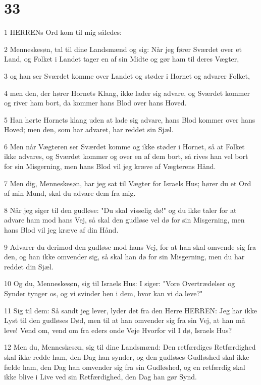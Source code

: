 \chapter{33}

\par 1 HERRENs Ord kom til mig således:
\par 2 Menneskesøn, tal til dine Landsmænd og sig: Når jeg fører Sværdet over et Land, og Folket i Landet tager en af sin Midte og gør ham til deres Vægter,
\par 3 og han ser Sværdet komme over Landet og støder i Hornet og advarer Folket,
\par 4 men den, der hører Hornets Klang, ikke lader sig advare, og Sværdet kommer og river ham bort, da kommer hans Blod over hans Hoved.
\par 5 Han hørte Hornets klang uden at lade sig advare, hans Blod kommer over hans Hoved; men den, som har advaret, har reddet sin Sjæl.
\par 6 Men når Vægteren ser Sværdet komme og ikke støder i Hornet, så at Folket ikke advares, og Sværdet kommer og over en af dem bort, så rives han vel bort for sin Misgerning, men hans Blod vil jeg kræve af Vægterens Hånd.
\par 7 Men dig, Menneskesøn, har jeg sat til Vægter for Israels Hus; hører du et Ord af min Mund, skal du advare dem fra mig.
\par 8 Når jeg siger til den gudløse: "Du skal visselig dø!" og du ikke taler for at advare ham mod hans Vej, så skal den gudløse vel dø for sin Misgerning, men hans Blod vil jeg kræve af din Hånd.
\par 9 Advarer du derimod den gudløse mod hans Vej, for at han skal omvende sig fra den, og han ikke omvender sig, så skal han dø for sin Misgerning, men du har reddet din Sjæl.
\par 10 Og du, Menneskesøn, sig til Israels Hus: I siger: "Vore Overtrædelser og Synder tynger os, og vi svinder hen i dem, hvor kan vi da leve?"
\par 11 Sig til dem: Så sandt jeg lever, lyder det fra den Herre HERREN: Jeg har ikke Lyst til den gudløses Død, men til at han omvender sig fra sin Vej, at han må leve! Vend om, vend om fra eders onde Veje Hvorfor vil I dø, Israels Hus?
\par 12 Men du, Menneskesøn, sig til dine Landsmænd: Den retfærdiges Retfærdighed skal ikke redde ham, den Dag han synder, og den gudløses Gudløshed skal ikke fælde ham, den Dag han omvender sig fra sin Gudløshed, og en retfærdig skal ikke blive i Live ved sin Retfærdighed, den Dag han gør Synd.
